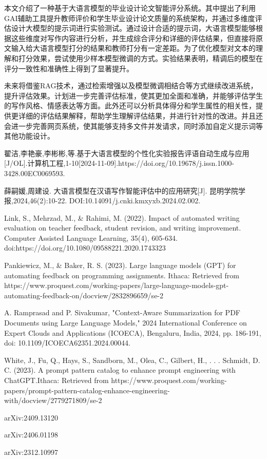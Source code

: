 \documentclass{article}
\begin{document}
本文介绍了一种基于大语言模型的毕业设计论文智能评分系统。其中提出了利用GAI辅助工具提升教师评价和学生毕业设计论文质量的系统架构，并通过多维度评估设计大模型的提示词进行实验测试。通过设计合适的提示词，大语言模型能够根据这些维度对写作内容进行分析，并生成综合评分和详细的评估结果，但直接将原文输入给大语言模型打分的结果和教师打分有一定差距。为了优化模型对文本的理解和打分效果，尝试使用少样本模型微调的方式。实验结果表明，精调后的模型在评分一致性和准确性上得到了显著提升。

未来将借鉴RAG技术，通过检索增强以及模型微调相结合等方式继续改进系统，提升评估效果。计划进一步完善评估标准，使其更加全面和准确，并能够评估学生的写作风格、情感表达等方面。此外还可以分析具体得分和学生属性的相关性，提供更详细的评估结果解释，帮助学生理解评估结果，并进行针对性的改进。并且还会进一步完善网页系统，使其能够支持多文件并发请求，同时添加自定义提示词等其他功能设计。

\begin{thebibliography}{99}

翟洁,李艳豪,李彬彬,等.基于大语言模型的个性化实验报告评语自动生成与应用[J/OL].计算机工程,1-10[2024-11-09].https://doi.org/10.19678/j.issn.1000-3428.00EC0069593.

薛嗣媛,周建设. 大语言模型在汉语写作智能评估中的应用研究[J]. 昆明学院学报,2024,46(2):10-22. DOI:10.14091/j.cnki.kmxyxb.2024.02.002.

Link, S., Mehrzad, M., \& Rahimi, M. (2022). Impact of automated writing evaluation on teacher feedback, student revision, and writing improvement. Computer Assisted Language Learning, 35(4), 605-634. doi:https://doi.org/10.1080/09588221.2020.1743323

Pankiewicz, M., \& Baker, R. S. (2023). Large language models (GPT) for automating feedback on programming assignments. Ithaca: Retrieved from https://www.proquest.com/working-papers/large-language-models-gpt-automating-feedback-on/docview/2832896659/se-2 

A. Ramprasad and P. Sivakumar, "Context-Aware Summarization for PDF Documents using Large Language Models," 2024 International Conference on Expert Clouds and Applications (ICOECA), Bengaluru, India, 2024, pp. 186-191, doi: 10.1109/ICOECA62351.2024.00044. 

White, J., Fu, Q., Hays, S., Sandborn, M., Olea, C., Gilbert, H., . . . Schmidt, D. C. (2023). A prompt pattern catalog to enhance prompt engineering with ChatGPT.Ithaca: Retrieved from https://www.proquest.com/working-papers/prompt-pattern-catalog-enhance-engineering-with/docview/2779271809/se-2

arXiv:2409.13120

arXiv:2406.01198

arXiv:2312.10997

\end{thebibliography}
\end{document}
